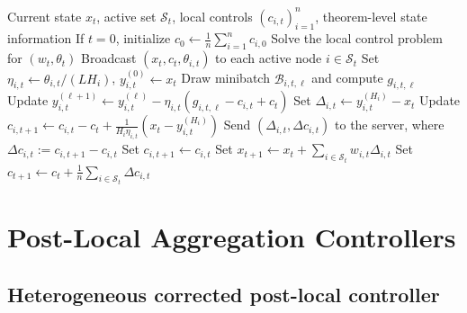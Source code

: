 \documentclass{article}
\theoremstyle{definition}
\begin{document}
\begin{algorithm}[H]
\caption{HEW-Local SGD}
\label{alg:main}
\begin{algorithmic}[1]
\Require Current state $x_t$, active set $\mathcal S_t$, local controls $(c_{i,t})_{i=1}^n$, theorem-level state information
\State If $t=0$, initialize $c_0\gets \frac1n\sum_{i=1}^n c_{i,0}$
\State Solve the local control problem for $(w_t,\theta_t)$
\State Broadcast $(x_t,c_t,\theta_{i,t})$ to each active node $i\in\mathcal S_t$
    \State Set $\eta_{i,t}\gets \theta_{i,t}/(L H_i)$, $y_{i,t}^{(0)}\gets x_t$
        \State Draw minibatch $\mathcal B_{i,t,\ell}$ and compute $g_{i,t,\ell}$
        \State Update $y_{i,t}^{(\ell+1)}\gets y_{i,t}^{(\ell)}-\eta_{i,t}(g_{i,t,\ell}-c_{i,t}+c_t)$
    \EndFor
    \State Set $\Delta_{i,t}\gets y_{i,t}^{(H_i)}-x_t$
    \State Update $c_{i,t+1}\gets c_{i,t}-c_t+\frac{1}{H_i\eta_{i,t}}(x_t-y_{i,t}^{(H_i)})$
    \State Send $(\Delta_{i,t},\Delta c_{i,t})$ to the server, where $\Delta c_{i,t}:=c_{i,t+1}-c_{i,t}$
\EndFor
{}
    \State Set $c_{i,t+1}\gets c_{i,t}$
\EndFor
\State Set $x_{t+1}\gets x_t+\sum_{i\in\mathcal S_t}w_{i,t}\Delta_{i,t}$
\State Set $c_{t+1}\gets c_t+\frac1n\sum_{i\in\mathcal S_t}\Delta c_{i,t}$
\end{algorithmic}
\end{algorithm}

\section{Post-Local Aggregation Controllers}
\label{sec:postlocal-main}
\subsection{Heterogeneous corrected post-local controller}
\end{document}
